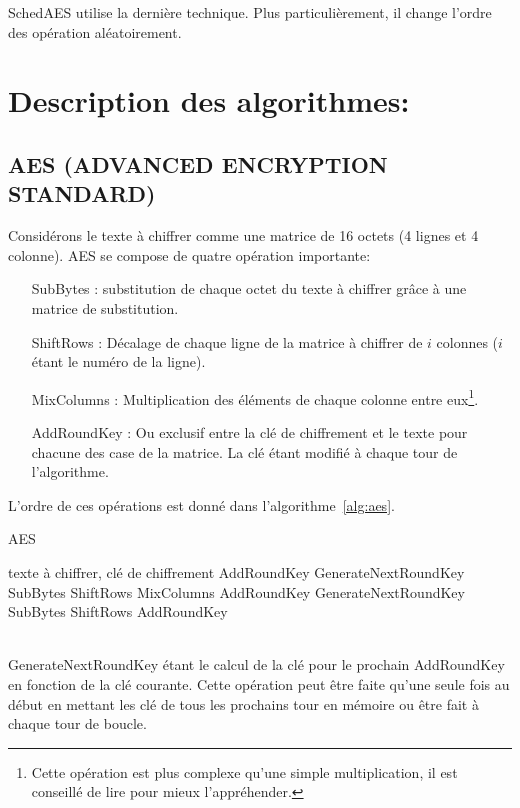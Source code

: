 \documentclass[letterpaper]{article}
\begin{document}
SchedAES utilise la dernière technique. Plus particulièrement, il change l'ordre des opération aléatoirement.\\

\section{Description des algorithmes:}
\subsection{AES (ADVANCED ENCRYPTION STANDARD)}
Considérons le texte à chiffrer comme une matrice de 16 octets (4 lignes et 4 colonne).
AES se compose de quatre opération importante:\\
\begin{itemize}
    \item[SubBytes :] substitution de chaque octet du texte à chiffrer grâce à une matrice de substitution.
    \item[ShiftRows :] Décalage de chaque ligne de la matrice à chiffrer de $i$ colonnes ($i$ étant le numéro de la ligne).
    \item[MixColumns :] Multiplication des éléments de chaque colonne entre eux\footnote{Cette opération est plus complexe qu'une simple multiplication, il est conseillé de lire \cite{fips197} pour mieux l'appréhender.}.
    \item[AddRoundKey :] Ou exclusif entre la clé de chiffrement et le texte pour chacune des case de la matrice. La clé étant modifié à chaque tour de l'algorithme.
\end{itemize}

L'ordre de ces opérations est donné dans l'algorithme~\ref{alg:aes}.
\begin{algorithm}
    \caption{AES}
    \label{alg:aes}
    \begin{algorithmic}[1]
        \REQUIRE texte à chiffrer, clé de chiffrement
        \STATE AddRoundKey
        \STATE GenerateNextRoundKey
            \STATE SubBytes
            \STATE ShiftRows
            \STATE MixColumns
            \STATE AddRoundKey
            \STATE GenerateNextRoundKey
        \ENDFOR
        \STATE SubBytes
        \STATE ShiftRows
        \STATE AddRoundKey
    \end{algorithmic}
\end{algorithm}\\

GenerateNextRoundKey étant le calcul de la clé pour le prochain AddRoundKey en fonction de la clé courante.
Cette opération peut être faite qu'une seule fois au début en mettant les clé de tous les prochains tour en mémoire ou être fait à chaque tour de boucle.
\end{document}
